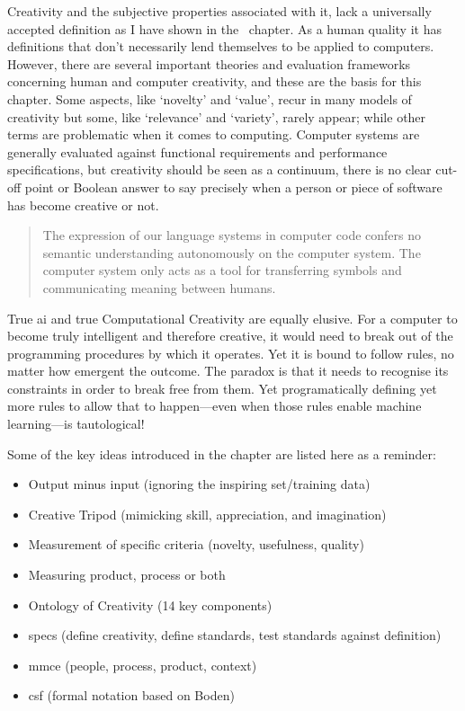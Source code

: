 Creativity and the subjective properties associated with it, lack a universally accepted definition as I have shown in the~ chapter. As a human quality it has definitions that don’t necessarily lend themselves to be applied to computers. However, there are several important theories and evaluation frameworks concerning human and computer creativity, and these are the basis for this chapter. Some aspects, like `novelty' and `value', recur in many models of creativity but some, like `relevance' and `variety', rarely appear; while other terms are problematic when it comes to computing. Computer systems are generally evaluated against functional requirements and performance specifications, but creativity should be seen as a continuum, there is no clear cut-off point or Boolean answer to say precisely when a person or piece of software has become creative or not.

\begin{quotation}
  The expression of our language systems in computer code confers no semantic understanding autonomously on the computer system. The computer system only acts as a tool for transferring symbols and communicating meaning between humans. 
\end{quotation}

True \gls{ai} and true Computational Creativity are equally elusive. For a computer to become truly intelligent and therefore creative, it would need to break out of the programming procedures by which it operates. Yet it is bound to follow rules, no matter how emergent the outcome. The paradox is that it needs to recognise its constraints in order to break free from them. Yet programatically defining yet more rules to allow that to happen---even when those rules enable machine learning---is tautological!

\spirals

Some of the key ideas introduced in the  chapter are listed here as a reminder:

\begin{itemize}
  \item Output minus input (ignoring the inspiring set/training data)
  \item Creative Tripod (mimicking skill, appreciation, and imagination)
  \item Measurement of specific criteria (novelty, usefulness, quality)
  \item Measuring product, process or both
  \item Ontology of Creativity (14 key components)
  \item \gls{specs} (define creativity, define standards, test standards against definition)
  \item \gls{mmce} (people, process, product, context)
  \item \gls{csf} (formal notation based on Boden)
\end{itemize}


